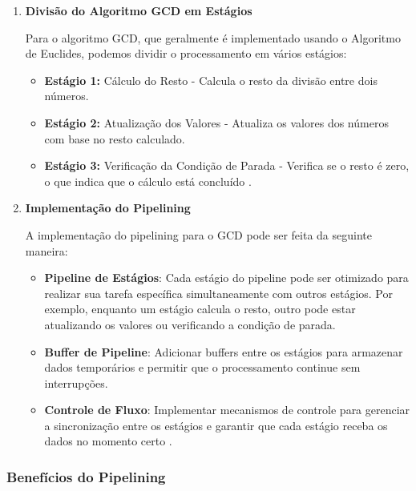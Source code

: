 \documentclass[a4paper,11pt]{article} %
\begin{document}
\begin{enumerate}
\item \textbf{Divisão do Algoritmo GCD em Estágios}



Para o algoritmo GCD, que geralmente é implementado usando o Algoritmo de Euclides, podemos dividir o processamento em vários estágios:

\begin{itemize}
    \item \textbf{Estágio 1:} Cálculo do Resto - Calcula o resto da divisão entre dois números.
    \item \textbf{Estágio 2:} Atualização dos Valores - Atualiza os valores dos números com base no resto calculado.
    \item \textbf{Estágio 3:} Verificação da Condição de Parada - Verifica se o resto é zero, o que indica que o cálculo está concluído \cite{Knuth1997}.
\end{itemize}

\item \textbf{Implementação do Pipelining}

A implementação do pipelining para o GCD pode ser feita da seguinte maneira:

\begin{itemize}
    \item \textbf{Pipeline de Estágios}: Cada estágio do pipeline pode ser otimizado para realizar sua tarefa específica simultaneamente com outros estágios. Por exemplo, enquanto um estágio calcula o resto, outro pode estar atualizando os valores ou verificando a condição de parada.
    \item \textbf{Buffer de Pipeline}: Adicionar buffers entre os estágios para armazenar dados temporários e permitir que o processamento continue sem interrupções.
    \item \textbf{Controle de Fluxo}: Implementar mecanismos de controle para gerenciar a sincronização entre os estágios e garantir que cada estágio receba os dados no momento certo \cite{Patterson2013}.
\end{itemize}

\end {enumerate}

\subsubsection{Benefícios do Pipelining}
\end{document}
